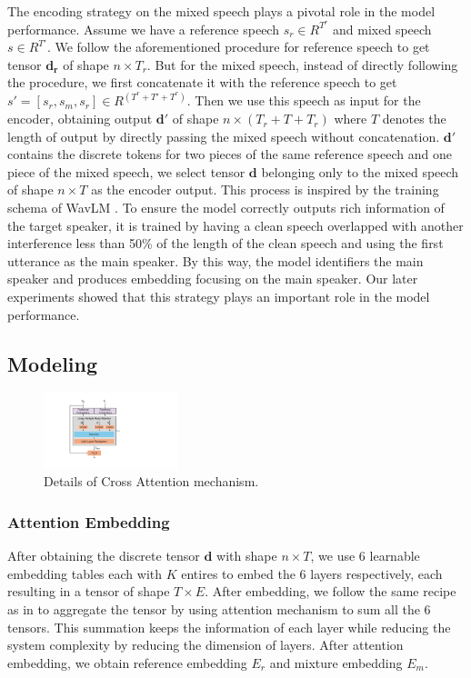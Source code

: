 \documentclass[conference]{IEEEtran}
\begin{document}
The encoding strategy on the mixed speech plays a pivotal role in the model performance. Assume we 
have a reference speech \(s_r \in R^{T^r} \) and mixed speech \(s \in R^{T'}\). 
We follow the 
aforementioned procedure for 
reference speech to get tensor \(\bm{d_r}\) of shape \(n \times T_r\). But for the mixed 
speech, instead of directly following the procedure, we first concatenate it with 
the reference speech to get \(s' = [s_r, s_m, s_r] \in R^{(T^r+T'+T^r)}\). Then we use this speech 
as input for the encoder, obtaining output \(\bm{d'}\) of shape \(n \times (T_r+T+T_r)\) where \(T\) 
denotes the length of output by directly passing the mixed speech without concatenation. \(\bm{d'}\) 
contains the discrete tokens for two pieces of the same reference speech and one piece of the mixed 
speech, we select tensor \(\bm{d}\) belonging only to the mixed speech of shape \(n\times T\) as the 
encoder output. This process is inspired by the training schema of WavLM \cite{wavlm}. To ensure the 
model correctly outputs rich information of the target speaker, it is trained by 
having a clean speech overlapped with another interference less than 50\% of the length of the clean 
speech and using the first utterance as the main speaker. By this way, the model identifiers the 
main speaker and produces embedding focusing on the main speaker. Our later experiments showed that 
this strategy plays an important role in the model performance. 



\subsection{Modeling}
\begin{figure}
\centering
\includegraphics[width=0.35\textwidth]{assets/cross_attention.pdf}
\caption{Details of Cross Attention mechanism.}
\label{cross_attention}
\end{figure}
\subsubsection{Attention Embedding}
After obtaining the discrete tensor \(\bm{d}\) with shape \(n\times T\), we use 6
learnable embedding tables each with \(K\) entires to embed the 6 layers 
respectively, each resulting in a tensor of shape \(T \times E\). 
After embedding, we follow the same recipe as in \cite{dasb} to 
aggregate the tensor by using attention mechanism to sum all the 6 tensors. This summation 
keeps the information of each layer while reducing the system complexity by reducing the 
dimension of layers. After attention embedding, we obtain reference embedding \(E_r\) and 
mixture embedding \(E_m\).
\end{document}
